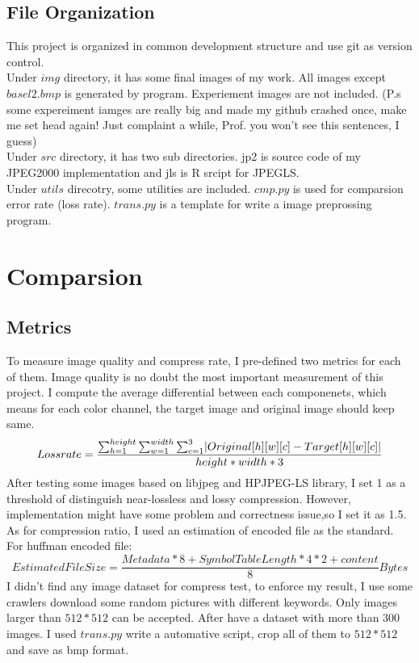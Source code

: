 \documentclass[UTF8, letterpaper, 14pt]{article}
\DeclarePairedDelimiter\abs{\lvert}{\rvert}%
\begin{document}
\subsection{File Organization}
This project is organized in common development structure and use git as version control.\\
Under $img$ directory, it has some final images of my work. All images except $basel2.bmp$ is generated by program. Experiement images are not included. (P.s some expereiment iamges are really big and made my github crashed once, make me set head again! Just complaint a while, Prof. you won't see this sentences, I guess)\\
Under $src$ directory, it has two sub directories. jp2 is source code of my JPEG2000 implementation and jls is R srcipt for JPEGLS.\\
Under $utils$ direcotry, some utilities are included. $cmp.py$ is used for comparsion error rate (loss rate). $trans.py$ is a template for write a image preprossing program. \\
\section{Comparsion}
\subsection{Metrics}
To measure image quality and compress rate, I pre-defined two metrics for each of them. Image quality is no doubt the most important measurement of this project. I compute the average differential between each componenets, which means for each color channel, the target image and original image should keep same.
\[
Loss rate =  \frac{\sum_{h=1}^{height}\sum_{w=1}^{width}\sum_{c=1}^{3} \abs{Original[h][w][c] - Target[h][w][c]}}{height * width * 3}
\]
After testing some images based on libjpeg and HPJPEG-LS library, I set 1 as a threshold of distinguish near-lossless and lossy compression. However, implementation might have some problem and correctness issue,so I set it as 1.5.\\
As for compression ratio, I used an estimation of encoded file as the standard. For huffman encoded file:
 \[
Estimated File Size =  \frac{Metadata*8+Symbol Table Length*4*2+content}{8} Bytes
\]
I didn't find any image dataset for compress test, to enforce my result, I use some crawlers download some random pictures with different keywords. Only images larger than $512*512$ can be accepted. After have a dataset with more than 300 images. I used $trans.py$ write a automative script, crop all of them to $512*512$ and save as bmp format.
\end{document}
